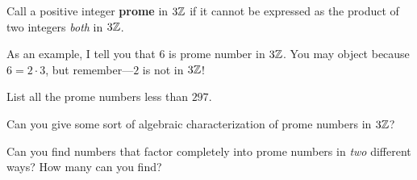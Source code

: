 \documentclass[nooutcomes]{ximera}
\begin{document}
\begin{definition}
Call a positive integer \textbf{prome} in $3\mathbb Z$ if it cannot be
expressed as the product of two integers \textit{both} in $3\mathbb Z$.
\end{definition}

As an example, I tell you that $6$ is prome number in $3\mathbb Z$. You may
object because $6 = 2\cdot 3$, but remember---$2$ is not in $3\mathbb Z$!


\begin{question}
List all the prome numbers less than $297$.
\end{question}

\begin{question}
Can you give some sort of algebraic characterization of prome numbers
in $3\mathbb Z$? 
\end{question}

\begin{question}
Can you find numbers that factor completely into prome numbers in
\textit{two} different ways? How many can you find?
\end{question}
\end{document}
